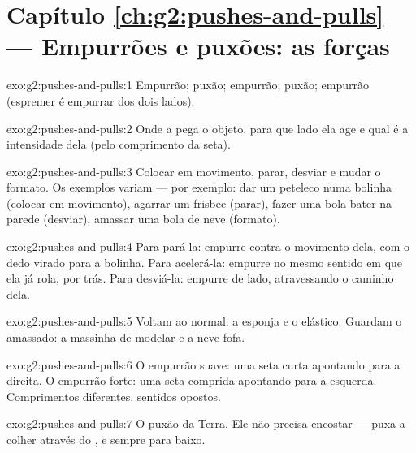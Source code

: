 \section*{Capítulo \ref{ch:g2:pushes-and-pulls} --- Empurrões e puxões: as forças}

\begin{solution}{exo:g2:pushes-and-pulls:1}
Empurrão; puxão; empurrão; puxão; empurrão (espremer é empurrar dos
dois lados).
\end{solution}

\begin{solution}{exo:g2:pushes-and-pulls:2}
Onde a  pega o objeto, para que lado ela age e qual é a
intensidade dela (pelo comprimento da seta).
\end{solution}

\begin{solution}{exo:g2:pushes-and-pulls:3}
Colocar em movimento, parar, desviar e mudar o formato. Os exemplos
variam --- por exemplo: dar um peteleco numa bolinha (colocar em
movimento), agarrar um frisbee (parar), fazer uma bola bater na
parede (desviar), amassar uma bola de neve (formato).
\end{solution}

\begin{solution}{exo:g2:pushes-and-pulls:4}
Para pará-la: empurre contra o movimento dela, com o dedo virado para
a bolinha. Para acelerá-la: empurre no mesmo sentido em que ela já
rola, por trás. Para desviá-la: empurre de lado, atravessando o
caminho dela.
\end{solution}

\begin{solution}{exo:g2:pushes-and-pulls:5}
Voltam ao normal: a esponja e o elástico. Guardam o amassado: a
massinha de modelar e a neve fofa.
\end{solution}

\begin{solution}{exo:g2:pushes-and-pulls:6}
O empurrão suave: uma seta curta apontando para a direita. O empurrão
forte: uma seta comprida apontando para a esquerda. Comprimentos
diferentes, sentidos opostos.
\end{solution}

\begin{solution}{exo:g2:pushes-and-pulls:7}
O puxão da Terra. Ele não precisa encostar --- puxa a colher através
do , e sempre para baixo.
\end{solution}

